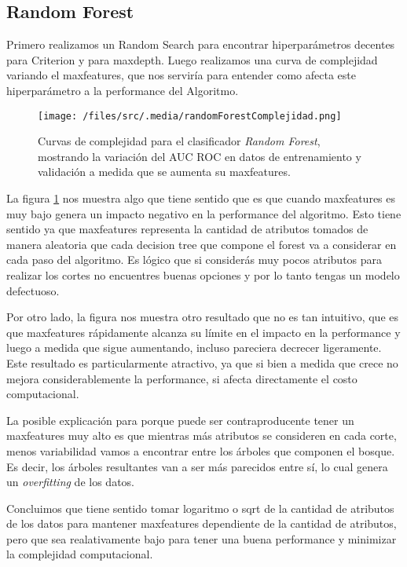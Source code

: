 \subsection{Random Forest}

Primero realizamos un Random Search para encontrar hiperparámetros decentes para Criterion y para maxdepth. Luego realizamos una curva de complejidad variando el maxfeatures, que nos serviría para entender como afecta este hiperparámetro a la performance del Algoritmo. 

\begin{figure}[!htbp]
    \centering
    \texttt{[image: /files/src/.media/randomForestComplejidad.png]}
    \caption{Curvas de complejidad para el clasificador \textit{Random Forest}, mostrando la variación del AUC ROC en datos de entrenamiento y validación a medida que se aumenta su maxfeatures.}
    \label{RFComplexity}
\end{figure}


La figura \ref{RFComplexity} nos muestra algo que tiene sentido que es que cuando maxfeatures es muy bajo genera un impacto negativo en la performance del algoritmo. Esto tiene sentido ya que maxfeatures representa la cantidad de atributos tomados de manera aleatoria que cada decision tree que compone el forest va a considerar en cada paso del algoritmo. Es lógico que si considerás muy pocos atributos para realizar los cortes no encuentres buenas opciones y por lo tanto tengas un modelo defectuoso.

Por otro lado, la figura nos muestra otro resultado que no es tan intuitivo, que es que maxfeatures rápidamente alcanza su límite en el impacto en la performance y luego a medida que sigue aumentando, incluso pareciera decrecer ligeramente. Este resultado es particularmente atractivo, ya que si bien a medida que crece no mejora considerablemente la performance, si afecta directamente el costo computacional. 

La posible explicación para porque puede ser contraproducente tener un maxfeatures muy alto es que mientras más atributos se consideren en cada corte, menos variabilidad vamos a encontrar entre los árboles que componen el bosque. Es decir, los árboles resultantes van a ser más parecidos entre sí, lo cual genera un \textit{overfitting} de los datos.  

Concluimos que tiene sentido tomar logaritmo o sqrt de la cantidad de atributos de los datos para mantener maxfeatures dependiente de la cantidad de atributos, pero que sea realativamente bajo para tener una buena performance y minimizar la complejidad computacional. 

